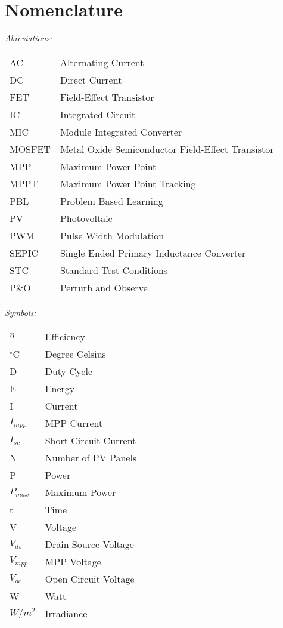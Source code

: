 \chapter*{Nomenclature}

\vspace{-10mm} %
\textit{Abreviations:}\newline
\begin{tabular}{ll} %
AC & Alternating Current\\
DC & Direct Current\\
FET & Field-Effect Transistor\\
IC & Integrated Circuit\\
MIC & Module Integrated Converter\\
MOSFET & Metal Oxide Semiconductor Field-Effect Transistor\\
MPP & Maximum Power Point\\
MPPT & Maximum Power Point Tracking\\
PBL & Problem Based Learning\\
PV & Photovoltaic\\
PWM & Pulse Width Modulation\\
SEPIC & Single Ended Primary Inductance Converter\\
STC & Standard Test Conditions\\
P\&O & Perturb and Observe\\
\end{tabular}

\vspace{5mm} %

\noindent\textit{Symbols:}\newline
\begin{tabular}{ll}
$\eta$ & Efficiency\\
$^\circ$C & Degree Celsius\\
D & Duty Cycle\\
E & Energy\\
I & Current\\
$I_{mpp}$ & MPP Current\\
$I_{sc}$ & Short Circuit Current\\
N & Number of PV Panels \\
P & Power\\
$P_{max}$ & Maximum Power\\
t & Time\\
V & Voltage\\
$V_{ds}$ & Drain Source Voltage\\
$V_{mpp}$ & MPP Voltage\\
$V_{oc}$ & Open Circuit Voltage\\
W & Watt\\
$W/m^2$ & Irradiance\\
\end{tabular}